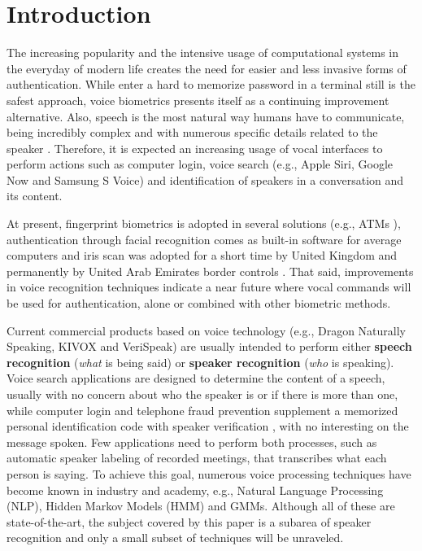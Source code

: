 \chapter{Introduction}
\label{ch:intro}

The increasing popularity and the intensive usage of computational systems in the everyday of modern life creates the need for easier and less invasive forms of authentication. While enter a hard to memorize password in a terminal still is the safest approach, voice biometrics presents itself as a continuing improvement alternative. Also, speech is the most natural way humans have to communicate, being incredibly complex and with numerous specific details related to the speaker \cite{bimbot.et.al.2004}. Therefore, it is expected an increasing usage of vocal interfaces to perform actions such as computer login, voice search (e.g., Apple Siri, Google Now and Samsung S Voice) and identification of speakers in a conversation and its content.

At present, fingerprint biometrics is adopted in several solutions (e.g., ATMs \cite{wang.wu.2002}), authentication through facial recognition comes as built-in software for average computers and iris scan was adopted for a short time by United Kingdom and permanently by United Arab Emirates border controls \cite{sasse.2007, raisi.khouri.2008}. That said, improvements in voice recognition techniques indicate a near future where vocal commands will be used for authentication, alone or combined with other biometric methods.

Current commercial products based on voice technology (e.g., Dragon Naturally Speaking, KIVOX and VeriSpeak) are usually intended to perform either \textbf{speech recognition} (\emph{what} is being said) or \textbf{speaker recognition} (\emph{who} is speaking). Voice search applications are designed to determine the content of a speech, usually with no concern about who the speaker is or if there is more than one, while computer login and telephone fraud prevention supplement a memorized personal identification code with speaker verification \cite{reynolds.1995}, with no interesting on the message spoken. Few applications need to perform both processes, such as automatic speaker labeling of recorded meetings, that transcribes what each person is saying. To achieve this goal, numerous voice processing techniques have become known in industry and academy, e.g., Natural Language Processing (NLP), Hidden Markov Models (HMM) and GMMs. Although all of these are state-of-the-art, the subject covered by this paper is a subarea of speaker recognition and only a small subset of techniques will be unraveled.

